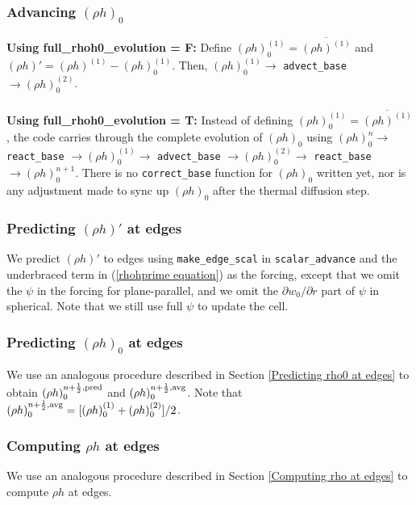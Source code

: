 \subsubsection{Advancing $(\rho h)_0$}
{\bf Using full\_rhoh0\_evolution = F:}  Define 
$(\rho h)_0^{(1)} = \overline{(\rho h)^{(1)}}$  
and $(\rho h)' = (\rho h)^{(1)}-(\rho h)_0^{(1)}$.  Then, $(\rho h)_0^{(1)} \rightarrow$ 
{\tt advect\_base} $\rightarrow (\rho h)_0^{(2)}$.\\ \\
{\bf Using full\_rhoh0\_evolution = T:}
 Instead of defining $(\rho h)_0^{(1)} = \overline{(\rho h)^{(1)}}$, the code carries 
through the complete evolution of $(\rho h)_0$ using $(\rho h)_0^n \rightarrow$ {\tt react\_base}
$\rightarrow (\rho h)_0^{(1)} \rightarrow$ {\tt advect\_base}
$\rightarrow (\rho h)_0^{(2)} \rightarrow$ {\tt react\_base} $\rightarrow (\rho h)_0^{n+1}$.  
There is no {\tt correct\_base} function for $(\rho h)_0$ written yet, nor is any 
adjustment made to sync up $(\rho h)_0$ after the thermal diffusion step.
\subsubsection{Predicting $(\rho h)'$ at edges}\label{Predicting rhohprime at edges}
We predict $(\rho h)'$ to 
edges using {\tt make\_edge\_scal} in {\tt scalar\_advance} and the underbraced term in 
(\ref{rhohprime equation}) as the forcing, except that we omit the $\psi$ in the forcing for plane-parallel, and we omit the $\partial w_0/\partial r$ part of $\psi$ in spherical.  Note that we still use full $\psi$ to update the cell.
\subsubsection{Predicting $(\rho h)_0$ at edges}
We use an analogous procedure described in Section \ref{Predicting rho0 at edges} to 
obtain $(\rho h)_0^{n+\frac{1}{2},\rm{pred}}$ and $(\rho h)_0^{n+\frac{1}{2},\rm{avg}}$.  Note that 
$(\rho h)_0^{n+\frac{1}{2},{\rm avg}} = [(\rho h)_0^{(1)} + (\rho h)_0^{(2)}]/2$.
\subsubsection{Computing $\rho h$ at edges}
We use an analogous procedure described in Section \ref{Computing rho at edges} to compute
$\rho h$ at edges.
